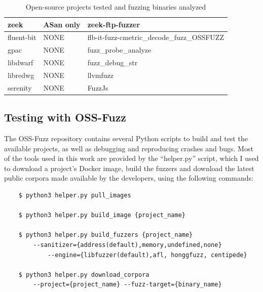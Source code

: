 \begin{table}[h!]
{\begin{tabular}{|l|l|l|}
zeek             & ASan only                & zeek-ftp-fuzzer           \\ 
\hline
fluent-bit       & NONE                & flb-it-fuzz-cmetric\_decode\_fuzz\_OSSFUZZ         \\
gpac             & NONE                & fuzz\_probe\_analyze                               \\
libdwarf         & NONE                & fuzz\_debug\_str                                   \\
libredwg         & NONE                & llvmfuzz                                           \\
serenity         & NONE                & FuzzJs                                             \\
\hline
\end{tabular}}
\vspace{10pt}
\caption{Open-source projects tested and fuzzing binaries analyzed}
\label{fuzzing-table}
\end{table}





\newpage
\subsection{Testing with OSS-Fuzz} \label{test}
The OSS-Fuzz repository contains several Python scripts to build and test the available projects, as well as debugging and reproducing crashes and bugs. Most of the tools used in this work are provided by the ``helper.py'' script, which I used to download a project's Docker image, build the fuzzers and download the latest public corpora made available by the developers, using the following commands:
\begin{verbatim}
    $ python3 helper.py pull_images 

    $ python3 helper.py build_image {project_name}

    $ python3 helper.py build_fuzzers {project_name}
        --sanitizer={address(default),memory,undefined,none} 
            --engine={libfuzzer(default),afl, honggfuzz, centipede}
        
    $ python3 helper.py download_corpora 
        --project={project_name} --fuzz-target={binary_name}
\end{verbatim}

